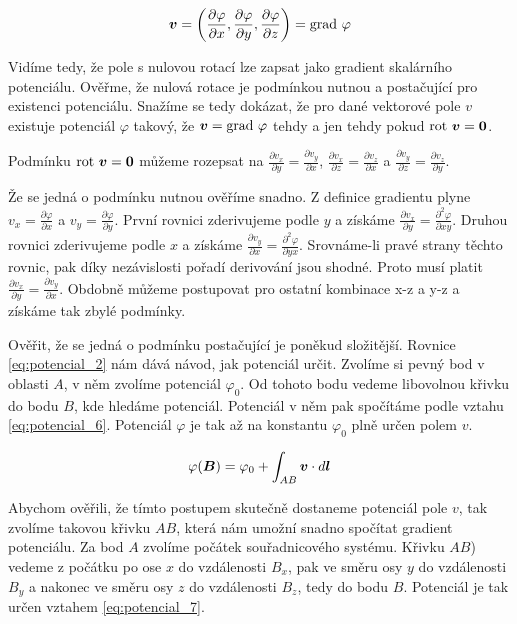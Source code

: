 \begin{equation}
\label{eq:potencial_5}
\boldsymbol{v} = \left(\frac{\partial \varphi}{\partial x}, \frac{\partial \varphi}{\partial y}, \frac{\partial \varphi}{\partial z}\right) = \mathrm{grad} \ \varphi
\end{equation}

Vidíme tedy, že pole s nulovou rotací lze zapsat jako gradient skalárního potenciálu. Ověřme, že nulová rotace je podmínkou nutnou a postačující pro existenci
potenciálu. Snažíme se tedy dokázat, že pro dané vektorové pole \(v\) existuje potenciál \(\varphi\) takový, že \(\boldsymbol{v} = \mathrm{grad} \ \varphi\) tehdy a jen tehdy
pokud \(\mathrm{rot} \ \boldsymbol{v} = \boldsymbol{0}\).

Podmínku \(\mathrm{rot} \ \boldsymbol{v} = \boldsymbol{0}\) můžeme rozepsat na \(\frac{\partial v_x}{\partial y} = \frac{\partial v_y}{\partial x}\), \(\frac{\partial v_x}{\partial z} = \frac{\partial v_z}{\partial x}\) a \(\frac{\partial v_y}{\partial z} = \frac{\partial v_z}{\partial y}\).

Že se jedná o podmínku nutnou ověříme snadno. Z definice gradientu plyne \(v_x = \frac{\partial \varphi}{\partial x}\) a \(v_y = \frac{\partial \varphi}{\partial y}\). První rovnici zderivujeme podle \(y\) a získáme \(\frac{\partial v_x}{\partial y} = \frac{\partial^2 \varphi}{\partial x y}\). Druhou rovnici
zderivujeme podle \(x\) a získáme \(\frac{\partial v_y}{\partial x} = \frac{\partial^2 \varphi}{\partial y x}\). Srovnáme-li pravé strany těchto rovnic, pak
díky nezávislosti pořadí derivování jsou shodné. Proto musí platit \(\frac{\partial v_x}{\partial y} = \frac{\partial v_y}{\partial x}\). Obdobně můžeme
postupovat pro ostatní kombinace x-z a y-z a získáme tak zbylé podmínky.

Ověřit, že se jedná o podmínku postačující je poněkud složitější. Rovnice \eqref{eq:potencial_2} nám dává návod, jak potenciál určit. Zvolíme si pevný bod
v oblasti \(A\), v něm zvolíme potenciál \(\varphi_0\). Od tohoto bodu vedeme libovolnou křivku do bodu \(B\), kde hledáme potenciál. Potenciál v něm
pak spočítáme podle vztahu \eqref{eq:potencial_6}. Potenciál \(\varphi\) je tak až na konstantu \(\varphi_0\) plně určen polem \(v\).

\begin{equation}
\label{eq:potencial_6}
\varphi(\boldsymbol{B}) = \varphi_0 + \int_{AB} \boldsymbol{v} \cdot d\boldsymbol{l}
\end{equation}

Abychom ověřili, že tímto postupem skutečně dostaneme potenciál pole \(v\), tak zvolíme takovou křivku \(AB\), která nám umožní snadno spočítat gradient
potenciálu. Za bod \(A\) zvolíme počátek souřadnicového systému. Křivku \(AB\)) vedeme z počátku po ose \(x\) do vzdálenosti \(B_x\), pak ve směru osy
\(y\) do vzdálenosti \(B_y\) a nakonec ve směru osy \(z\) do vzdálenosti \(B_z\), tedy do bodu \(B\). Potenciál je tak určen vztahem \eqref{eq:potencial_7}.

